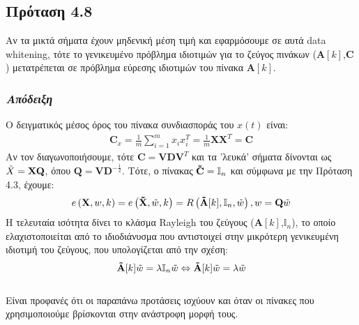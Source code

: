 \subsection*{\small{Πρόταση 4.8}}
Αν τα μικτά σήματα έχουν μηδενική μέση τιμή και εφαρμόσουμε σε αυτά data whitening, τότε το γενικευμένο πρόβλημα ιδιοτιμών για το ζεύγος πινάκων 
($\mathbf{A}[k]$,$\mathbf{C}$) μετατρέπεται σε πρόβλημα εύρεσης ιδιοτιμών του πίνακα $\mathbf{A}[k]$.
\subsubsection*{\small{\textit{Απόδειξη}}}
Ο δειγματικός μέσος όρος του πίνακα συνδιασποράς του $x(t)$ είναι:
\begin{align*}
\mathbf{C}_x = \frac{1}{m} \sum \limits_{i=1}^{m} x_i x_i^T = 
\frac{1}{m} \mathbf{X} \mathbf{X}^T = \mathbf{C}
\end{align*}
Αν τον διαγωνοποιήσουμε, τότε $\mathbf{C} = \mathbf{V} \mathbf{D} \mathbf{V}^T$ και τα 'λευκά' σήματα δίνονται ως $\Tilde{X} = \mathbf{X} \mathbf{Q}$, όπου $\mathbf{Q} = \mathbf{V} \mathbf{D}^{-\frac{1}{2}}$. Τότε, ο πίνακας $\mathbf{\Tilde{C}} = \mathbb{I}_n$ και σύμφωνα με την Πρόταση 4.3, έχουμε:
$$
e \left ( \mathbf{X},w,k \right ) = e \left ( \mathbf{\Tilde{X}},\Tilde{w},k \right ) = R \left ( \mathbf{\Tilde{A}}[k],\mathbb{I}_n,\Tilde{w} \right ), w = \mathbf{Q} \Tilde{w}
$$
Η τελευταία ισότητα δίνει το κλάσμα Rayleigh του ζεύγους ($\mathbf{A}[k]$,$\mathbb{I}_n$), το οποίο ελαχιστοποιείται από το ιδιοδιάνυσμα που αντιστοιχεί στην μικρότερη γενικευμένη ιδιοτιμή του ζεύγους, που υπολογίζεται από την σχέση:
$$
\mathbf{\Tilde{A}}[k] \Tilde{w} = \lambda \mathbb{I}_n \Tilde{w} \Leftrightarrow \mathbf{\Tilde{A}}[k] \Tilde{w} = \lambda \Tilde{w}
$$
\\ 
Είναι προφανές ότι οι παραπάνω προτάσεις ισχύουν και όταν οι πίνακες που χρησιμοποιούμε βρίσκονται στην ανάστροφη μορφή τους.

